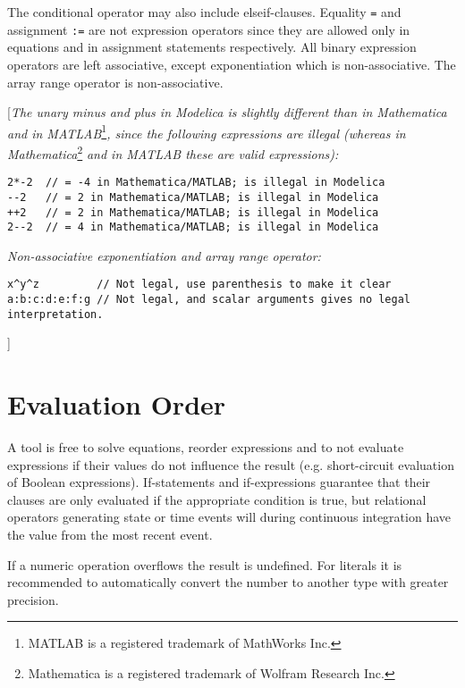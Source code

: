 The conditional operator may also include elseif-clauses. Equality \lstinline[basicstyle=\ttfamily]!=! and
assignment \lstinline[basicstyle=\ttfamily]!:=! are not expression operators since they are allowed only
in equations and in assignment statements respectively. All binary
expression operators are left associative, except exponentiation which
is non-associative. The array range operator is non-associative.

{[}\emph{The unary minus and plus in Modelica is slightly different than
in Mathematica and in MATLAB}\footnote{MATLAB is a registered trademark
  of MathWorks Inc.}\emph{, since the following expressions are illegal
(whereas in Mathematica}\footnote{Mathematica is a registered trademark
  of Wolfram Research Inc.} \emph{and in MATLAB these are valid
expressions):}
\begin{lstlisting}[language=modelica]
2*-2  // = -4 in Mathematica/MATLAB; is illegal in Modelica
--2   // = 2 in Mathematica/MATLAB; is illegal in Modelica
++2   // = 2 in Mathematica/MATLAB; is illegal in Modelica
2--2  // = 4 in Mathematica/MATLAB; is illegal in Modelica
\end{lstlisting}

\emph{Non-associative exponentiation and array range operator:}

\begin{lstlisting}[language=modelica]
x^y^z         // Not legal, use parenthesis to make it clear
a:b:c:d:e:f:g // Not legal, and scalar arguments gives no legal interpretation.
\end{lstlisting}
{]}

\section{Evaluation Order}

A tool is free to solve equations, reorder expressions and to not
evaluate expressions if their values do not influence the result (e.g.
short-circuit evaluation of Boolean expressions). If-statements and
if-expressions guarantee that their clauses are only evaluated if the
appropriate condition is true, but relational operators generating state
or time events will during continuous integration have the value from
the most recent event.

If a numeric operation overflows the result is undefined. For literals
it is recommended to automatically convert the number to another type
with greater precision.

